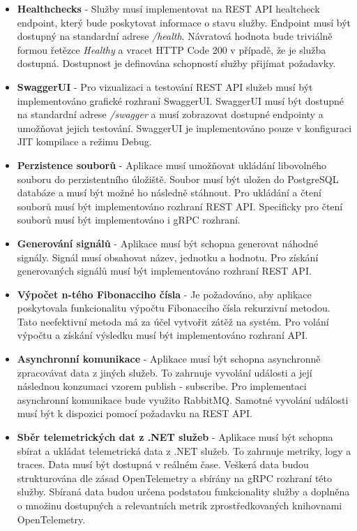 \begin{itemize}
  \item \textbf{Healthchecks} - Služby musí implementovat na REST API healtcheck endpoint, který bude poskytovat informace o stavu služby. Endpoint musí být dostupný na standardní adrese \emph{/health}. Návratová hodnota bude triviálně formou řetězce \emph{Healthy} a vracet HTTP Code 200 v případě, že je služba dostupná. Dostupnost je definována schopností služby přijímat požadavky.
  \item \textbf{SwaggerUI} - Pro vizualizaci a testování REST API služeb musí být implementováno grafické rozhraní SwaggerUI. SwaggerUI musí být dostupné na standardní adrese \emph{/swagger} a musí zobrazovat dostupné endpointy a umožňovat jejich testování. SwaggerUI je implementováno pouze v konfiguraci JIT kompilace a režimu Debug.
  \item \textbf{Perzistence souborů} - Aplikace musí umožňovat ukládání libovolného souboru do perzistentního úložiště. Soubor musí být uložen do PostgreSQL databáze a musí být možné ho následně stáhnout. Pro ukládání a čtení souborů musí být implementováno rozhraní REST API. Specificky pro čtení souborů musí být implementováno i gRPC rozhraní.
  \item \textbf{Generování signálů} - Aplikace musí být schopna generovat náhodné signály. Signál musí obsahovat název, jednotku a hodnotu. Pro získání generovaných signálů musí být implementováno rozhraní REST API.
  \item \textbf{Výpočet n-tého Fibonacciho čísla} - Je požadováno, aby aplikace poskytovala funkcionalitu výpočtu Fibonacciho čísla rekurzivní metodou. Tato neefektivní metoda má za účel vytvořit zátěž na systém. Pro volání výpočtu a získání výsledku musí být implementováno rozhraní API.
  \item \textbf{Asynchronní komunikace} - Aplikace musí být schopna asynchronně zpracovávat data z jiných služeb. To zahrnuje vyvolání události a její následnou konzumaci vzorem publish - subscribe. Pro implementaci asynchronní komunikace bude využito RabbitMQ. Samotné vyvolání události musí být k dispozici pomocí požadavku na REST API.
  \item \textbf{Sběr telemetrických dat z .NET služeb} - Aplikace musí být schopna sbírat a ukládat telemetrická data z .NET služeb. To zahrnuje metriky, logy a traces. Data musí být dostupná v reálném čase. Veškerá data budou strukturována dle zásad OpenTelemetry a sbírány na gRPC rozhraní této služby. Sbíraná data budou určena podstatou funkcionality služby a doplněna o množinu dostupných a relevantních metrik zprostředkovaných knihovnami OpenTelemetry.

\end{itemize}

